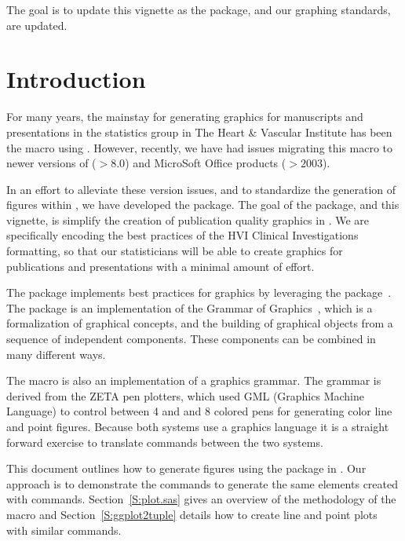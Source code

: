 \documentclass[nojss, letterpaper]{jss}\usepackage[]{graphicx}\usepackage[]{color}
\begin{document}
The goal is to update this vignette as the package, and our graphing standards, are updated. 

\section{Introduction}
For many years, the mainstay for generating graphics for manuscripts and presentations in the statistics group in The Heart \& Vascular Institute has been the  macro using . However, recently, we have had issues migrating this macro to newer versions of  ($> 8.0$) and MicroSoft Office products ($> 2003$). 

In an effort to alleviate these version issues, and to standardize the generation of figures within , we have developed the   package. The goal of the package, and this vignette, is simplify the creation of publication quality graphics in  . We are specifically encoding the best practices of the HVI Clinical Investigations formatting, so that our statisticians will be able to create graphics for publications and presentations with a minimal amount of effort.

The  package implements best practices for  graphics by leveraging the  package~\citep{Wickham:2009}. The  package is an implementation of the Grammar of Graphics~\citep{Wilkinson:2005}, which is a formalization of graphical concepts, and the building of graphical objects from a sequence of independent components. These components can be combined in many different ways.

The  macro is also an implementation of a graphics grammar. The grammar  is derived from the ZETA pen plotters, which used GML (Graphics Machine Language) to control between 4 and and 8 colored pens for generating color line and point figures. Because both systems use a graphics language it is a straight forward exercise to translate commands between the two systems. 

This document outlines how to generate figures using the  package in . Our approach is to demonstrate the  commands to generate the same elements created with  commands. Section~\ref{S:plot.sas} gives an overview of the methodology of the  macro and Section~\ref{S:ggplot2tuple} details how to create line and point plots with similar  commands. 
\end{document}
